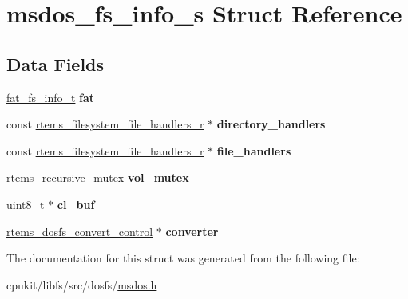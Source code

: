 \hypertarget{structmsdos__fs__info__s}{}\section{msdos\+\_\+fs\+\_\+info\+\_\+s Struct Reference}
\label{structmsdos__fs__info__s}
\subsection*{Data Fields}
\begin{DoxyCompactItemize}
\item 
\mbox{\label{structmsdos__fs__info__s_ade5933e063c77da631506efe3dcb894f}} 
\mbox{\hyperlink{structfat__fs__info__s}{fat\+\_\+fs\+\_\+info\+\_\+t}} {\bfseries fat}
\item 
\mbox{\label{structmsdos__fs__info__s_aa54c84674031cc92d08820ad438aa4d6}} 
const \mbox{\hyperlink{struct__rtems__filesystem__file__handlers__r}{rtems\+\_\+filesystem\+\_\+file\+\_\+handlers\+\_\+r}} $\ast$ {\bfseries directory\+\_\+handlers}
\item 
\mbox{\label{structmsdos__fs__info__s_a288d03e9e936c07a31038e85c7bf0c0a}} 
const \mbox{\hyperlink{struct__rtems__filesystem__file__handlers__r}{rtems\+\_\+filesystem\+\_\+file\+\_\+handlers\+\_\+r}} $\ast$ {\bfseries file\+\_\+handlers}
\item 
\mbox{\label{structmsdos__fs__info__s_a80f47bfa81c6ffac8c43f99dcf0a15e0}} 
rtems\+\_\+recursive\+\_\+mutex {\bfseries vol\+\_\+mutex}
\item 
\mbox{\label{structmsdos__fs__info__s_af464ee6301120909ed3307df4650d5f0}} 
uint8\+\_\+t $\ast$ {\bfseries cl\+\_\+buf}
\item 
\mbox{\label{structmsdos__fs__info__s_a7983cfa9b969b4275e62893a9eddb4e7}} 
\mbox{\hyperlink{structrtems__dosfs__convert__control}{rtems\+\_\+dosfs\+\_\+convert\+\_\+control}} $\ast$ {\bfseries converter}
\end{DoxyCompactItemize}


The documentation for this struct was generated from the following file\+:\begin{DoxyCompactItemize}
\item 
cpukit/libfs/src/dosfs/\mbox{\hyperlink{msdos_8h}{msdos.\+h}}\end{DoxyCompactItemize}
